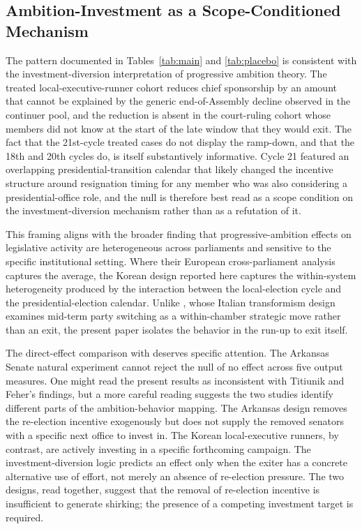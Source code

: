 \documentclass[11pt]{article}
\begin{document}
\subsection{Ambition-Investment as a Scope-Conditioned Mechanism}

The pattern documented in Tables~\ref{tab:main} and \ref{tab:placebo} is consistent with the investment-diversion interpretation of progressive ambition theory. The treated local-executive-runner cohort reduces chief sponsorship by an amount that cannot be explained by the generic end-of-Assembly decline observed in the continuer pool, and the reduction is absent in the court-ruling cohort whose members did not know at the start of the late window that they would exit. The fact that the 21st-cycle treated cases do not display the ramp-down, and that the 18th and 20th cycles do, is itself substantively informative. Cycle 21 featured an overlapping presidential-transition calendar that likely changed the incentive structure around resignation timing for any member who was also considering a presidential-office role, and the null is therefore best read as a scope condition on the investment-diversion mechanism rather than as a refutation of it.

This framing aligns with the broader \citet{hansen2015} finding that progressive-ambition effects on legislative activity are heterogeneous across parliaments and sensitive to the specific institutional setting. Where their European cross-parliament analysis captures the average, the Korean design reported here captures the within-system heterogeneity produced by the interaction between the local-election cycle and the presidential-election calendar. Unlike \citet{giommoni2022}, whose Italian transformism design examines mid-term party switching as a within-chamber strategic move rather than an exit, the present paper isolates the behavior in the run-up to exit itself.

The direct-effect comparison with \citet{titiunik2017} deserves specific attention. The Arkansas Senate natural experiment cannot reject the null of no effect across five output measures. One might read the present results as inconsistent with Titiunik and Feher's findings, but a more careful reading suggests the two studies identify different parts of the ambition-behavior mapping. The Arkansas design removes the re-election incentive exogenously but does not supply the removed senators with a specific next office to invest in. The Korean local-executive runners, by contrast, are actively investing in a specific forthcoming campaign. The investment-diversion logic predicts an effect only when the exiter has a concrete alternative use of effort, not merely an absence of re-election pressure. The two designs, read together, suggest that the removal of re-election incentive is insufficient to generate shirking; the presence of a competing investment target is required.
\end{document}
